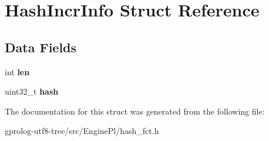 \hypertarget{structHashIncrInfo}{}\section{Hash\+Incr\+Info Struct Reference}
\label{structHashIncrInfo}
\subsection*{Data Fields}
\begin{DoxyCompactItemize}
\item 
int {\bfseries len}\hypertarget{structHashIncrInfo_adab7e9365193be88c2bb9e65edbf63bb}{}\label{structHashIncrInfo_adab7e9365193be88c2bb9e65edbf63bb}

\item 
uint32\+\_\+t {\bfseries hash}\hypertarget{structHashIncrInfo_a3f0d935d1523af0164e99832740c7df7}{}\label{structHashIncrInfo_a3f0d935d1523af0164e99832740c7df7}

\end{DoxyCompactItemize}


The documentation for this struct was generated from the following file\+:\begin{DoxyCompactItemize}
\item 
gprolog-\/utf8-\/tree/src/\+Engine\+Pl/hash\+\_\+fct.\+h\end{DoxyCompactItemize}
